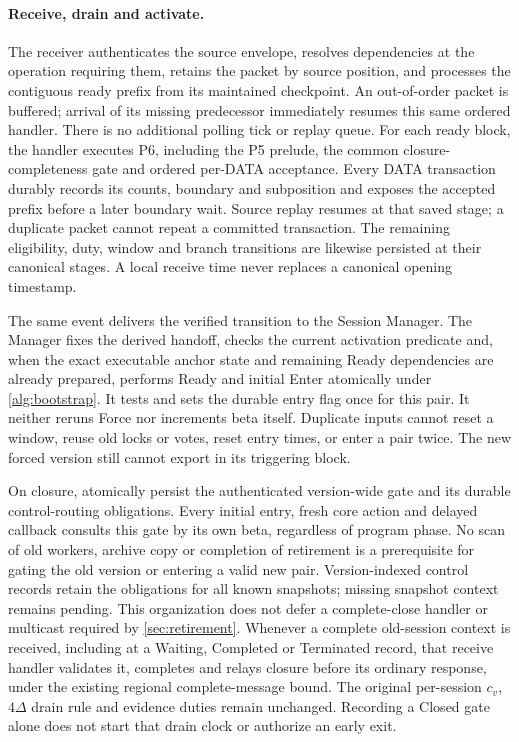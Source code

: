 \paragraph{Receive, drain and activate.}
The receiver authenticates the source envelope, resolves dependencies
at the operation requiring them, retains the packet by source position,
and processes the contiguous ready prefix
from its maintained checkpoint. An out-of-order packet is buffered;
arrival of its missing predecessor immediately resumes this same
ordered handler. There is no additional polling tick or replay queue.
For each ready block, the handler executes P6, including the P5 prelude,
the common closure-completeness gate and ordered per-DATA acceptance.
Every DATA transaction durably records its counts, boundary and subposition
and exposes the accepted prefix before a later boundary wait. Source
replay resumes at that saved stage; a duplicate packet cannot repeat a
committed transaction. The remaining eligibility, duty, window and branch
transitions are likewise persisted at their canonical stages. A local receive time
never replaces a canonical opening timestamp.

The same event delivers the verified transition to the Session Manager.
The Manager fixes the derived handoff, checks the current activation
predicate and, when the exact executable anchor state and remaining
Ready dependencies are already prepared, performs Ready and initial
Enter atomically under \cref{alg:bootstrap}. It tests and sets the
durable entry flag once for this pair. It neither reruns Force nor
increments beta itself. Duplicate inputs cannot reset a window, reuse
old locks or votes, reset entry times, or enter a pair twice. The new
forced version still cannot export in its triggering block.

On closure, atomically persist the authenticated version-wide
 gate and its durable control-routing obligations.
Every initial entry, fresh core action and delayed callback consults
this gate by its own beta, regardless of program phase. No scan of old
workers, archive copy or completion of retirement is a prerequisite for
gating the old version or entering a valid new pair. Version-indexed
control records retain the obligations for all known snapshots;
missing snapshot context remains pending. This organization does not
defer a complete-close handler or multicast required by
\cref{sec:retirement}. Whenever a complete old-session context is
received, including at a Waiting, Completed or Terminated record, that
receive handler validates it, completes and relays closure before its
ordinary response, under the existing regional complete-message bound.
The original per-session $c_v$, $4\Delta$ drain rule and evidence duties
remain unchanged. Recording a Closed gate alone does not start that
drain clock or authorize an early exit.


